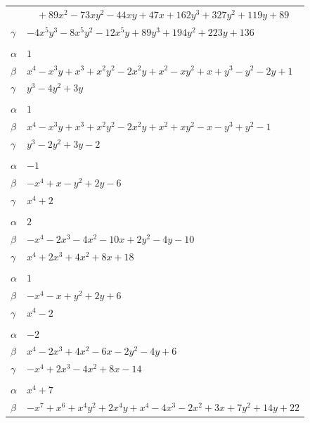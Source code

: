 \documentclass[11pt]{article}
\begin{document}
\begin{longtable}{@{}ll@{}}
 & $\quad +89x^{2}-73xy^{2}-44xy+47x+162y^{3}+327y^{2}+119y+89$\\
$\gamma$ & $-4x^{5}y^{3}-8x^{5}y^{2}-12x^{5}y+89y^{3}+194y^{2}+223y+136$\\
\addlinespace[3pt]
\multicolumn{2}{@{}l}{$\{i,j\}=\{9,21\}$, $k_{ij}=5$}\\
$\alpha$ & $1$\\
$\beta$ & $x^{4}-x^{3}y+x^{3}+x^{2}y^{2}-2x^{2}y+x^{2}-xy^{2}+x+y^{3}-y^{2}-2y+1$\\
$\gamma$ & $y^{3}-4y^{2}+3y$\\
\addlinespace[3pt]
\multicolumn{2}{@{}l}{$\{i,j\}=\{9,23\}$, $k_{ij}=5$}\\
$\alpha$ & $1$\\
$\beta$ & $x^{4}-x^{3}y+x^{3}+x^{2}y^{2}-2x^{2}y+x^{2}+xy^{2}-x-y^{3}+y^{2}-1$\\
$\gamma$ & $y^{3}-2y^{2}+3y-2$\\
\addlinespace[3pt]
\multicolumn{2}{@{}l}{$\{i,j\}=\{10,16\}$, $k_{ij}=2^{2}$}\\
$\alpha$ & $-1$\\
$\beta$ & $-x^{4}+x-y^{2}+2y-6$\\
$\gamma$ & $x^{4}+2$\\
\addlinespace[3pt]
\multicolumn{2}{@{}l}{$\{i,j\}=\{10,18\}$, $k_{ij}=2^{6}$}\\
$\alpha$ & $2$\\
$\beta$ & $-x^{4}-2x^{3}-4x^{2}-10x+2y^{2}-4y-10$\\
$\gamma$ & $x^{4}+2x^{3}+4x^{2}+8x+18$\\
\addlinespace[3pt]
\multicolumn{2}{@{}l}{$\{i,j\}=\{11,15\}$, $k_{ij}=2^{2}\cdot 3$}\\
$\alpha$ & $1$\\
$\beta$ & $-x^{4}-x+y^{2}+2y+6$\\
$\gamma$ & $x^{4}-2$\\
\addlinespace[3pt]
\multicolumn{2}{@{}l}{$\{i,j\}=\{11,17\}$, $k_{ij}=2^{5}$}\\
$\alpha$ & $-2$\\
$\beta$ & $x^{4}-2x^{3}+4x^{2}-6x-2y^{2}-4y+6$\\
$\gamma$ & $-x^{4}+2x^{3}-4x^{2}+8x-14$\\
\addlinespace[3pt]
\multicolumn{2}{@{}l}{$\{i,j\}=\{11,22\}$, $k_{ij}=2^{3}\cdot 3^{2}$}\\
$\alpha$ & $x^{4}+7$\\
$\beta$ & $-x^{7}+x^{6}+x^{4}y^{2}+2x^{4}y+x^{4}-4x^{3}-2x^{2}+3x+7y^{2}+14y+22$\\

\end{longtable}
\end{document}
